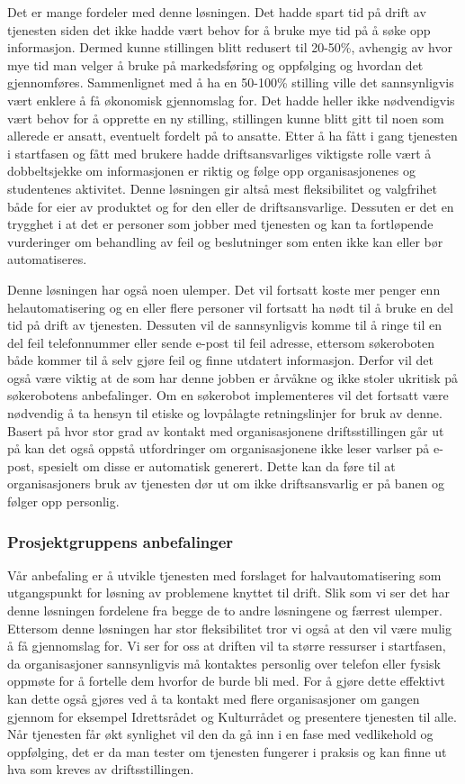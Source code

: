 Det er mange fordeler med denne løsningen. Det hadde spart tid på drift av tjenesten siden det ikke hadde vært behov for å bruke mye tid på å søke opp informasjon. Dermed kunne stillingen blitt redusert til 20-50\%, avhengig av hvor mye tid man velger å bruke på markedsføring og oppfølging og hvordan det gjennomføres. Sammenlignet med å ha en 50-100\% stilling ville det sannsynligvis vært enklere å få økonomisk gjennomslag for. Det hadde heller ikke nødvendigvis vært behov for å opprette en ny stilling, stillingen kunne blitt gitt til noen som allerede er ansatt, eventuelt fordelt på to ansatte. Etter å ha fått i gang tjenesten i startfasen og fått med brukere hadde driftsansvarliges viktigste rolle vært å dobbeltsjekke om informasjonen er riktig og følge opp organisasjonenes og studentenes aktivitet. Denne løsningen gir altså mest fleksibilitet og valgfrihet både for eier av produktet og for den eller de driftsansvarlige. Dessuten er det en trygghet i at det er personer som jobber med tjenesten og kan ta fortløpende vurderinger om behandling av feil og beslutninger som enten ikke kan eller bør automatiseres.

Denne løsningen har også noen ulemper. Det vil fortsatt koste mer penger enn helautomatisering og en eller flere personer vil fortsatt ha nødt til å bruke en del tid på drift av tjenesten. Dessuten vil de sannsynligvis komme til å ringe til en del feil telefonnummer eller sende e-post til feil adresse, ettersom søkeroboten både kommer til å selv gjøre feil og finne utdatert informasjon. Derfor vil det også være viktig at de som har denne jobben er årvåkne og ikke stoler ukritisk på søkerobotens anbefalinger. Om en søkerobot implementeres vil det fortsatt være nødvendig å ta hensyn til etiske og lovpålagte retningslinjer for bruk av denne. Basert på hvor stor grad av kontakt med organisasjonene driftsstillingen går ut på kan det også oppstå utfordringer om organisasjonene ikke leser varlser på e-post, spesielt om disse er automatisk generert. Dette kan da føre til at organisasjoners bruk av tjenesten dør ut om ikke driftsansvarlig er på banen og følger opp personlig. 

\subsubsection{Prosjektgruppens anbefalinger}
Vår anbefaling er å utvikle tjenesten med forslaget for halvautomatisering som utgangspunkt for løsning av problemene knyttet til drift. Slik som vi ser det har denne løsningen fordelene fra begge de to andre løsningene og færrest ulemper. Ettersom denne løsningen har stor fleksibilitet tror vi også at den vil være mulig å få gjennomslag for. Vi ser for oss at driften vil ta større ressurser i startfasen, da organisasjoner sannsynligvis må kontaktes personlig over telefon eller fysisk oppmøte for å fortelle dem hvorfor de burde bli med. For å gjøre dette effektivt kan dette også gjøres ved å ta kontakt med flere organisasjoner om gangen gjennom for eksempel Idrettsrådet og Kulturrådet og presentere tjenesten til alle. Når tjenesten får økt synlighet vil den da gå inn i en fase med vedlikehold og oppfølging, det er da man tester om tjenesten fungerer i praksis og kan finne ut hva som kreves av driftsstillingen. 

